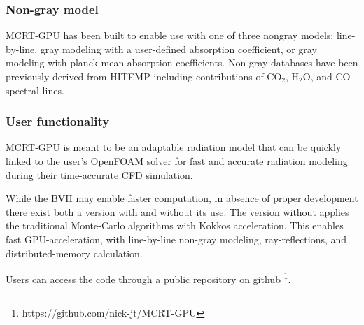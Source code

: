\subsubsection{Non-gray model}
MCRT-GPU has been built to enable use with one of three nongray models: line-by-line, gray modeling with a user-defined absorption coefficient, or gray modeling with planck-mean absorption coefficients. Non-gray databases have been previously derived from HITEMP \cite{Rothman2010HITEMPDatabase} including contributions of CO$_2$, H$_2$O, and CO spectral lines.


\subsubsection{User functionality}
MCRT-GPU is meant to be an adaptable radiation model that can be quickly linked to the user's OpenFOAM solver for fast and accurate radiation modeling during their time-accurate CFD simulation.

While the BVH may enable faster computation, in absence of proper development there exist both a version with and without its use.
The version without applies the traditional Monte-Carlo algorithms with Kokkos acceleration. This enables fast GPU-acceleration, with line-by-line non-gray modeling, ray-reflections, and distributed-memory calculation.

Users can access the code through a public repository on github \footnote{https://github.com/nick-jt/MCRT-GPU}.